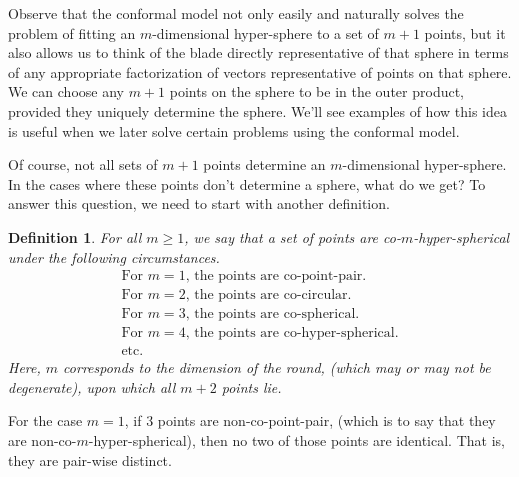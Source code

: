 \documentclass[12pt]{article}
\newtheorem{definition}{Definition}[section]
\begin{document}
Observe that the conformal model not only easily and
naturally solves the problem of fitting an $m$-dimensional hyper-sphere
to a set of $m+1$ points, but it also allows us to think of the blade directly
representative of that sphere in terms of any appropriate factorization
of vectors representative of points on that sphere.  We
can choose any $m+1$ points on the sphere to be in the outer product, provided they uniquely
determine the sphere.  We'll see examples of how this idea is
useful when we later solve certain problems using the conformal model.

Of course, not all sets of $m+1$ points determine
an $m$-dimensional hyper-sphere.  In the cases where these points don't determine a sphere, what do
we get?  To answer this question, we need to start with another definition.
\begin{definition}\label{def_co_hyper_spherical}
For all $m\geq 1$, we say that a set of points
are co-$m$-hyper-spherical under the following circumstances.
\begin{equation*}
\begin{array}{l}
\mbox{For $m=1$, the points are co-point-pair.} \\
\mbox{For $m=2$, the points are co-circular.} \\
\mbox{For $m=3$, the points are co-spherical.} \\
\mbox{For $m=4$, the points are co-hyper-spherical.} \\
\mbox{etc.}
\end{array}
\end{equation*}
Here, $m$ corresponds to the dimension of the round, (which may or may not be degenerate), upon
which all $m+2$ points lie.
\end{definition}

For the case $m=1$, if 3 points are non-co-point-pair, (which is to say that
they are non-co-$m$-hyper-spherical), then no two of those points are identical.
That is, they are pair-wise distinct.
\end{document}
